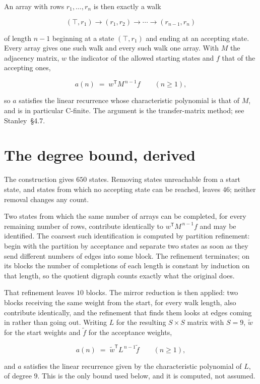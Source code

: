 \documentclass[11pt]{article}
\theoremstyle{definition}
\begin{document}
An array with rows $r_1,\dots,r_n$ is then exactly a walk

\[(\top,r_1) \to (r_1,r_2) \to \cdots \to (r_{n-1},r_n)\]

of length $n-1$ beginning at a state $(\top,r_1)$ and ending at an accepting state. Every array gives one such walk and every such walk one array. With $M$ the adjacency matrix, $w$ the indicator of the allowed starting states and $f$ that of the accepting ones,

\[a(n) \;=\; w^{\mathsf T} M^{\,n-1} f \qquad (n \ge 1),\]

so $a$ satisfies the linear recurrence whose characteristic polynomial is that of $M$, and is in particular C-finite. The argument is the transfer-matrix method; see Stanley~\S4.7.

\section{The degree bound, derived}

The construction gives $650$ states. Removing states unreachable from a start state, and states from which no accepting state can be reached, leaves $46$; neither removal changes any count.

Two states from which the same number of arrays can be completed, for every remaining number of rows, contribute identically to $w^{\mathsf T}M^{\,n-1}f$ and may be identified. The coarsest such identification is computed by partition refinement: begin with the partition by acceptance and separate two states as soon as they send different numbers of edges into some block. The refinement terminates; on its blocks the number of completions of each length is constant by induction on that length, so the quotient digraph counts exactly what the original does.

That refinement leaves $10$ blocks. The mirror reduction is then applied: two blocks receiving the same weight from the start, for every walk length, also contribute identically, and the refinement that finds them looks at edges coming in rather than going out. Writing $L$ for the resulting $S \times S$ matrix with $S = 9$, $\tilde w$ for the start weights and $\tilde f$ for the acceptance weights,

\[a(n) \;=\; \tilde w^{\mathsf T} L^{\,n-1} \tilde f \qquad (n \ge 1),\]

and $a$ satisfies the linear recurrence given by the characteristic polynomial of $L$, of degree $9$. This is the only bound used below, and it is computed, not assumed.
\end{document}
